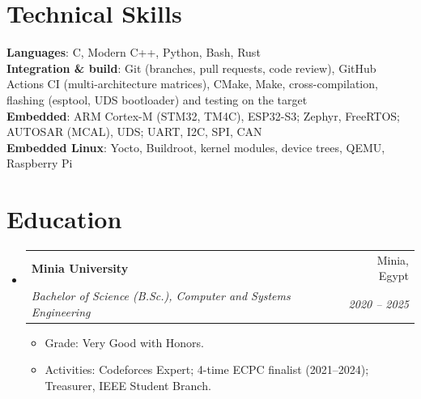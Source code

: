 \documentclass[letterpaper,11pt]{article}
\makeatletter
\newcommand{\resumeItem}[1]{
  \item\small{
    {#1 \vspace{-2pt}}
  }
}
\newcommand{\resumeSubheading}[4]{
  \vspace{-2pt}\item
    \begin{tabular*}{0.97\textwidth}[t]{l@{\extracolsep{\fill}}r}
      \textbf{#1} & #2 \\
      \textit{\small#3} & \textit{\small #4} \\
    \end{tabular*}\vspace{-7pt}
}
\newcommand{\resumeSubHeadingListStart}{\begin{itemize}[leftmargin=0.15in, label={}]}
\newcommand{\resumeSubHeadingListEnd}{\end{itemize}}
\newcommand{\resumeItemListStart}{\begin{itemize}}
\newcommand{\resumeItemListEnd}{\end{itemize}\vspace{-5pt}}
\makeatother
\begin{document}
\section{Technical Skills}
 \begin{itemize}[leftmargin=0.15in, label={}]
    \small{\item{
     \textbf{Languages}{: C, Modern C++, Python, Bash, Rust} \\
     \textbf{Integration \& build}{: Git (branches, pull requests, code review), GitHub Actions CI (multi-architecture matrices), CMake, Make, cross-compilation, flashing (esptool, UDS bootloader) and testing on the target} \\
     \textbf{Embedded}{: ARM Cortex-M (STM32, TM4C), ESP32-S3; Zephyr, FreeRTOS; AUTOSAR (MCAL), UDS; UART, I2C, SPI, CAN} \\
     \textbf{Embedded Linux}{: Yocto, Buildroot, kernel modules, device trees, QEMU, Raspberry Pi}
    }}
 \end{itemize}

\section{Education}
  \resumeSubHeadingListStart
    \resumeSubheading
      {Minia University}{Minia, Egypt}
      {Bachelor of Science (B.Sc.), Computer and Systems Engineering}{2020 -- 2025}
      \resumeItemListStart
        \resumeItem{Grade: Very Good with Honors.}
        \resumeItem{Activities: Codeforces Expert; 4-time ECPC finalist (2021--2024); Treasurer, IEEE Student Branch.}
      \resumeItemListEnd
  \resumeSubHeadingListEnd


\end{document}
